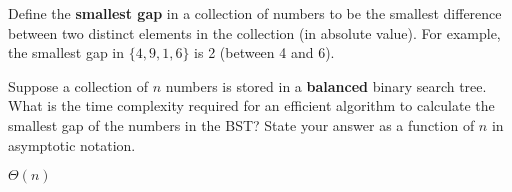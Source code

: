 \begin{prob}
    Define the \textbf{smallest gap} in a collection of numbers to be the smallest difference
    between two distinct elements in the collection (in absolute value).
    For example, the smallest gap in $\{4, 9, 1, 6\}$ is 2 (between 4 and 6).

    Suppose a collection of $n$ numbers is stored in a \textbf{balanced} binary search
    tree. 
    What is the time complexity required for an efficient algorithm to calculate
    the smallest gap of the numbers in the BST? State your answer as a function of $n$ in
    asymptotic notation.

    \begin{soln}
        $\Theta(n)$
    \end{soln}

\end{prob}
